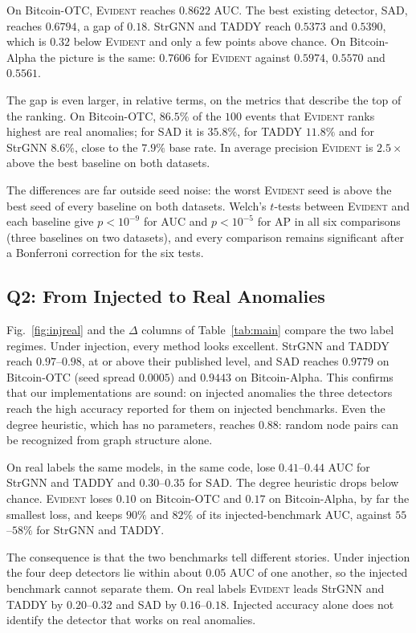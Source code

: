 \documentclass[pdflatex,sn-basic]{sn-jnl}
\newcommand{\evident}{\textsc{Evident}}
\theoremstyle{definition}
\theoremstyle{plain}
\begin{document}
On Bitcoin-OTC, \evident{} reaches $0.8622$ AUC. The best existing detector,
SAD, reaches $0.6794$, a gap of $0.18$. StrGNN and TADDY reach $0.5373$ and
$0.5390$, which is $0.32$ below \evident{} and only a few points above chance.
On Bitcoin-Alpha the picture is the same: $0.7606$ for \evident{} against
$0.5974$, $0.5570$ and $0.5561$.

The gap is even larger, in relative terms, on the metrics that describe the
top of the ranking. On Bitcoin-OTC, $86.5\%$ of the $100$ events that \evident{} ranks highest are
real anomalies; for SAD it is $35.8\%$, for TADDY $11.8\%$ and for StrGNN
$8.6\%$, close to the $7.9\%$ base rate. In average precision \evident{} is
$2.5\times$ above the best baseline on both datasets.

The differences are far outside seed noise: the worst \evident{} seed is above
the best seed of every baseline on both datasets. Welch's $t$-tests between \evident{} and each baseline give
$p<10^{-9}$ for AUC and $p<10^{-5}$ for AP in all six comparisons (three
baselines on two datasets), and every comparison remains significant after a
Bonferroni correction for the six tests.

\subsection{Q2: From Injected to Real Anomalies}
Fig.~\ref{fig:injreal} and the $\Delta$ columns of Table~\ref{tab:main} compare
the two label regimes. Under injection, every method looks excellent. StrGNN
and TADDY reach $0.97$--$0.98$, at or above their published level, and SAD
reaches $0.9779$ on Bitcoin-OTC (seed spread $0.0005$) and $0.9443$ on
Bitcoin-Alpha. This confirms that our implementations are sound: on injected
anomalies the three detectors reach the high accuracy reported for them on
injected benchmarks. Even the degree heuristic, which has no parameters,
reaches $0.88$: random node pairs can be recognized from graph structure
alone.

On real labels the same models, in the same code, lose $0.41$--$0.44$ AUC
for StrGNN and TADDY and $0.30$--$0.35$ for SAD. The degree heuristic drops below
chance. \evident{} loses $0.10$ on
Bitcoin-OTC and $0.17$ on Bitcoin-Alpha, by far the smallest loss, and keeps
$90\%$ and $82\%$ of its injected-benchmark AUC, against $55$--$58\%$ for
StrGNN and TADDY.

The consequence is that the two benchmarks tell different stories. Under
injection the four deep detectors lie within about $0.05$ AUC of one another, so the
injected benchmark cannot separate them. On real labels \evident{} leads StrGNN
and TADDY by $0.20$--$0.32$ and SAD by $0.16$--$0.18$. Injected accuracy alone
does not identify the detector that works on real anomalies.
\end{document}
